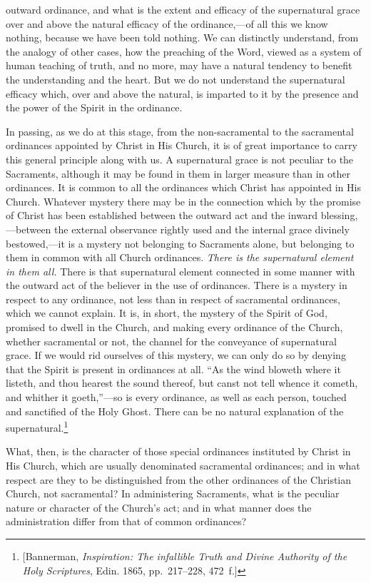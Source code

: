 \documentclass[
  english,
]{book}
\begin{document}
outward ordinance, and what is the extent and efficacy of the supernatural grace over and above the natural efficacy of the ordinance,---of all this we know nothing, because we have been told nothing. We can distinctly understand, from the analogy of other cases, how the preaching of the Word, viewed as a system of human teaching of truth, and no more, may have a natural tendency to benefit the understanding and the heart. But we do not understand the supernatural efficacy which, over and above the natural, is imparted to it by the presence and the power of the Spirit in the ordinance.

In passing, as we do at this stage, from the non-sacramental to the sacramental ordinances appointed by Christ in His Church, it is of great importance to carry this general principle along with us. A supernatural grace is not peculiar to the Sacraments, although it may be found in them in larger measure than in other ordinances. It is common to all the ordinances which Christ has appointed in His Church. Whatever mystery there may be in the connection which by the promise of Christ has been established between the outward act and the inward blessing,---between the external observance rightly used and the internal grace divinely bestowed,---it is a mystery not belonging to Sacraments alone, but belonging to them in common with all Church ordinances. \emph{There is the supernatural element in them all.} There is that supernatural element connected in some manner with the outward act of the believer in the use of ordinances. There is a mystery in respect to any ordinance, not less than in respect of sacramental ordinances, which we cannot explain. It is, in short, the mystery of the Spirit of God, promised to dwell in the Church, and making every ordinance of the Church, whether sacramental or not, the channel for the conveyance of supernatural grace. If we would rid ourselves of this mystery, we can only do so by denying that the Spirit is present in ordinances at all. ``As the wind bloweth where it listeth, and thou hearest the sound thereof, but canst not tell whence it cometh, and whither it goeth,''---so is every ordinance, as well as each person, touched and sanctified of the Holy Ghost. There can be no natural explanation of the supernatural.\footnote{{[}Bannerman, \emph{Inspiration: The infallible Truth and Divine Authority of the Holy Scriptures}, Edin. 1865, pp.~217--228, 472~f.{]}}

What, then, is the character of those special ordinances instituted by Christ in His Church, which are usually denominated sacramental ordinances; and in what respect are they to be distinguished from the other ordinances of the Christian Church, not sacramental? In administering Sacraments, what is the peculiar nature or character of the Church's act; and in what manner does the administration differ from that of common ordinances?
\end{document}
